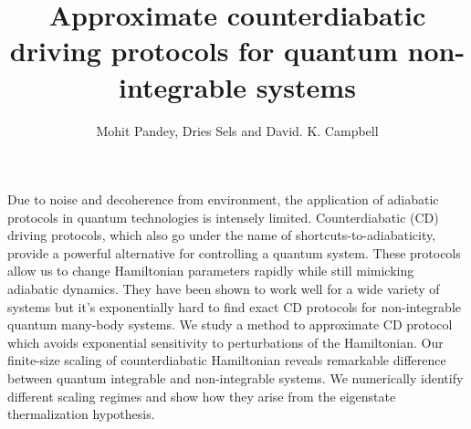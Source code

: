 \documentclass[11pt,a4paper]{article}
\author{Mohit Pandey, Dries Sels and David. K. Campbell}
\title{Approximate counterdiabatic driving protocols for quantum non-integrable systems  }
\begin{document}
\maketitle



Due to noise and decoherence from environment, the application of adiabatic protocols in quantum technologies is intensely limited. Counterdiabatic (CD) driving protocols, which also go under the name of shortcuts-to-adiabaticity, provide a powerful alternative for controlling a quantum system. These protocols allow us to change Hamiltonian parameters rapidly while still mimicking adiabatic dynamics. They have been shown to work well for a wide variety of systems but it's exponentially hard to find exact CD protocols for non-integrable quantum many-body systems. We study a method to approximate CD protocol which avoids exponential sensitivity to perturbations of the Hamiltonian. Our finite-size scaling of counterdiabatic Hamiltonian reveals remarkable difference between quantum integrable and non-integrable systems. We numerically identify different scaling regimes and show how they arise from the eigenstate thermalization hypothesis.  
\end{document}
